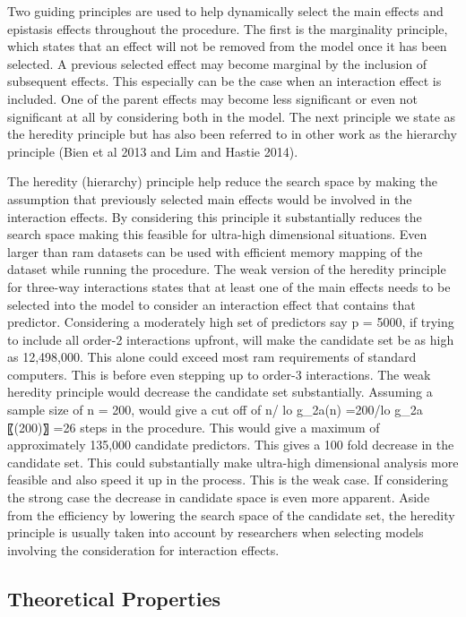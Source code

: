 \documentclass[]{book}
\theoremstyle{definition}
\theoremstyle{definition}
\theoremstyle{remark}
\begin{document}
Two guiding principles are used to help dynamically select the main
effects and epistasis effects throughout the procedure. The first is the
marginality principle, which states that an effect will not be removed
from the model once it has been selected. A previous selected effect may
become marginal by the inclusion of subsequent effects. This especially
can be the case when an interaction effect is included. One of the
parent effects may become less significant or even not significant at
all by considering both in the model. The next principle we state as the
heredity principle but has also been referred to in other work as the
hierarchy principle (Bien et al 2013 and Lim and Hastie 2014).

The heredity (hierarchy) principle help reduce the search space by
making the assumption that previously selected main effects would be
involved in the interaction effects. By considering this principle it
substantially reduces the search space making this feasible for
ultra-high dimensional situations. Even larger than ram datasets can be
used with efficient memory mapping of the dataset while running the
procedure. The weak version of the heredity principle for three-way
interactions states that at least one of the main effects needs to be
selected into the model to consider an interaction effect that contains
that predictor. Considering a moderately high set of predictors say p =
5000, if trying to include all order-2 interactions upfront, will make
the candidate set be as high as 12,498,000. This alone could exceed most
ram requirements of standard computers. This is before even stepping up
to order-3 interactions. The weak heredity principle would decrease the
candidate set substantially. Assuming a sample size of n = 200, would
give a cut off of n/ lo g\_2a(n) =200/lo g\_2a〖(200)〗 =26 steps in the
procedure. This would give a maximum of approximately 135,000 candidate
predictors. This gives a 100 fold decrease in the candidate set. This
could substantially make ultra-high dimensional analysis more feasible
and also speed it up in the process. This is the weak case. If
considering the strong case the decrease in candidate space is even more
apparent. Aside from the efficiency by lowering the search space of the
candidate set, the heredity principle is usually taken into account by
researchers when selecting models involving the consideration for
interaction effects.

\subsection{Theoretical Properties}\label{theoretical-properties}
\end{document}
